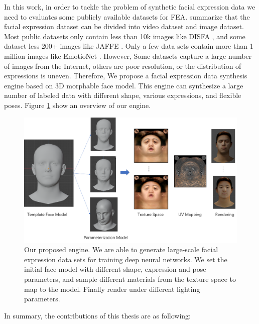 In this work, in order to tackle the problem of synthetic facial expression data we need to evaluates some publicly available datasets for FEA. \citep{khanSurveyAnalysisHuman2020} summarize that the facial expression dataset can be divided into video dataset and image dataset. Most public datasets only contain less than 10k images like DISFA \citep{mavadatiDISFASpontaneousFacial2013} , and some dataset less 200+ images like JAFFE \citep{lyonsCodingFacialExpressions2020}. Only a few data sets contain more than 1 million images like EmotioNet \citep{benitez-quirozEmotioNetAccurateRealTime2016a}. However, Some datasets capture a large number of images from the Internet, others are poor resolution, or the distribution of expressions is uneven. Therefore, We propose a facial expression data synthesis engine based on 3D morphable face model. This engine can synthesize a large number of labeled data with different shape, various expressions, and flexible poses. Figure \ref{fig:overview} show an overview of our engine.

\begin{figure}
    \centering
    \includegraphics[width=\textwidth]{./figs/overview.png}
    \caption{Our proposed engine. We are able to generate large-scale facial expression data sets for training deep neural networks. We set the initial face model with different shape, expression and pose parameters, and sample different materials from the texture space to map to the model. Finally render under different lighting parameters.}
    \label{fig:overview}
\end{figure}



In summary, the contributions of this thesis are as following:

